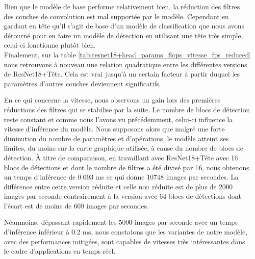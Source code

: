 \break

Bien que le modèle de base performe relativement bien, la réduction des filtres des couches de convolution est mal supportée par le modèle. Cependant en gardant en tête qu'il s'agit de base d'un modèle de classification que nous avons détourné pour en faire un modèle de détection en utilisant une tête très simple, celui-ci fonctionne plutôt bien.\\

Finalement, sur la table \ref{tab:resnet18+head_params_flops_vitesse_fps_reduced} nous retrouvons à nouveau une relation quadratique entre les différentes versions de ResNet18+Tête. Cela est vrai jusqu'à un certain facteur à partir duquel les paramètres d'autres couches deviennent significatifs.

En ce qui concerne la vitesse, nous observons un gain lors des premières réductions des filtres qui se stabilise par la suite. Le nombre de blocs de détection reste constant et comme nous l'avons vu précédemment, celui-ci influence la vitesse d'inférence du modèle. Nous supposons alors que malgré une forte diminution du nombre de paramètres et d'opérations, le modèle atteint ses limites, du moins sur la carte graphique utilisée, à cause du nombre de blocs de détection. À titre de comparaison, en travaillant avec ResNet18+Tête avec 16 blocs de détections et dont le nombre de filtres a été divisé par 16, nous obtenons un temps d'inférence de 0.093 ms ce qui donne 10748 images par secondes. La différence entre cette version réduite et celle non réduite est de plus de 2000 images par seconde contrairement à la version avec 64 blocs de détections dont l'écart est de moins de 600 images par secondes.

Néanmoins, dépassant rapidement les 5000 images par seconde avec un temps d'inférence inférieur à 0.2 ms, nous constatons que les variantes de notre modèle, avec des performances mitigées, sont capables de vitesses très intéressantes dans le cadre d'applications en temps réel.

